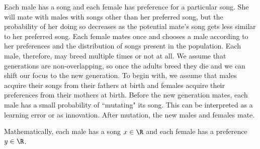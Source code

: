 \documentclass{article}\usepackage[]{graphicx}\usepackage[]{color}
\begin{document}
Each male has a song and each female has preference for a particular song. She will mate with males with songs other than her preferred song, but the probability of her doing so decreases as the potential mate's song gets less similar to her preferred song. Each female mates once and chooses a male according to her preferences and the distribution of songs present in the population. Each male, therefore, may breed multiple times or not at all. We assume that generations are non-overlapping, so once the adults breed they die and we can shift our focus to the new generation. To begin with, we assume that males acquire their songs from their fathers at birth and females acquire their preferences from their mothers at birth. Before the new generation mates, each male has a small probability of ``mutating" its song. This can be interpreted as a learning error or as innovation. After mutation, the new males and females mate. 

Mathematically, each male has a song $x\in \R$ and each female has a preference $y\in\R$.
\end{document}
